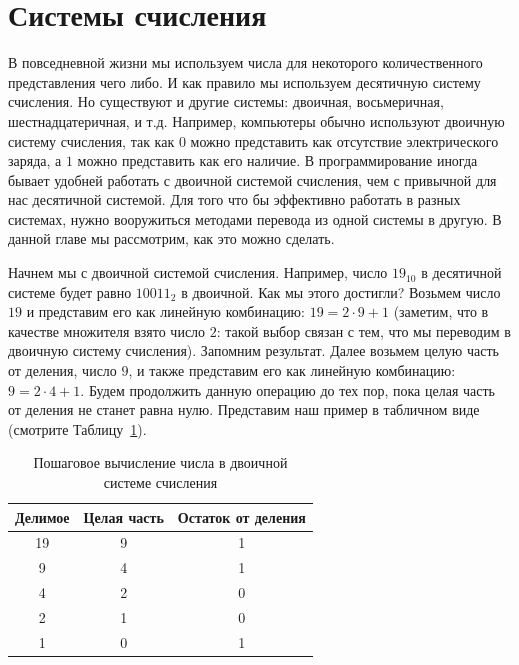 \section{Системы счисления}

В повседневной жизни мы используем числа для некоторого количественного
представления чего либо. И как правило мы используем десятичную систему 
счисления. Но существуют и другие системы: двоичная, восьмеричная, 
шестнадцатеричная, и т.д. Например, компьютеры обычно используют 
двоичную систему счисления, так как $0$ можно представить как отсутствие 
электрического заряда, а $1$ можно представить как его наличие. 
В программирование иногда бывает удобней работать с двоичной системой
счисления, чем с привычной для нас десятичной системой. Для того что бы 
эффективно работать в разных системах, нужно вооружиться методами перевода
из одной системы в другую. В данной главе мы рассмотрим, как это можно сделать.

Начнем мы с двоичной системой счисления. Например, число $19_{10}$ в десятичной
системе будет равно $10011_{2}$ в двоичной. Как мы этого достигли? Возьмем число 
$19$ и представим его как линейную комбинацию: $19=2 \cdot 9 + 1$ (заметим, что в качестве 
множителя взято число $2$: такой выбор связан с тем, что мы переводим в двоичную систему 
счисления). Запомним результат. Далее возьмем целую часть от деления, 
число $9$, и также представим его как линейную комбинацию: $9=2 \cdot 4 + 1$. 
Будем продолжить данную операцию до тех пор, пока целая часть 
от деления не станет равна нулю. Представим наш пример в 
табличном виде (смотрите Таблицу~\ref{tab:binary}).

\begin{table}
\centering
\begin{tabular}{c|c|c}
\hline
Делимое & Целая часть & Остаток от деления \\\hline
\cellcolor{lightblue}19 & \cellcolor{lightblue}9 & \cellcolor{blue}1 \\
\cellcolor{lightblue}9  & \cellcolor{lightblue}4 & \cellcolor{lightblue}1 \\
\cellcolor{lightblue}4  & \cellcolor{lightblue}2 & \cellcolor{lightblue}0 \\
\cellcolor{lightblue}2  & \cellcolor{lightblue}1 & \cellcolor{lightblue}0 \\
\cellcolor{lightblue}1  & \cellcolor{lightblue}0 & \cellcolor{red}1 \\
\hline
\end{tabular}
\label{tab:binary}
\caption{Пошаговое вычисление числа в двоичной системе счисления}
\end{table}

